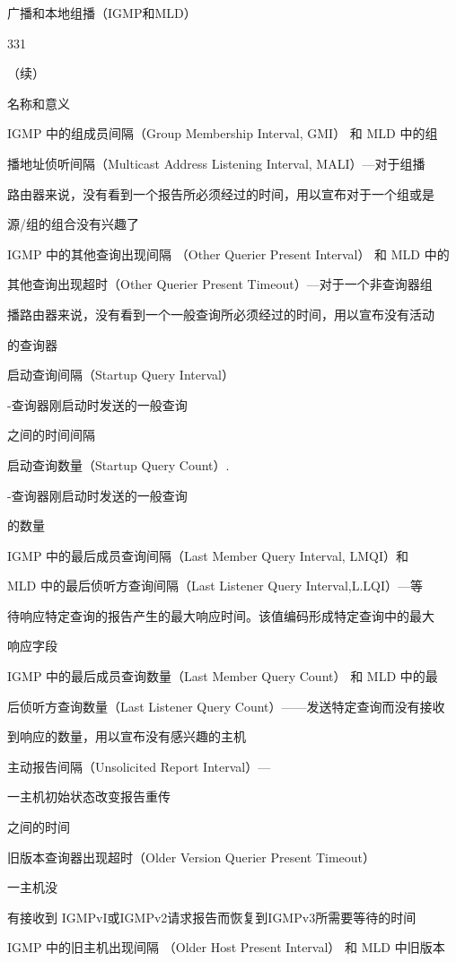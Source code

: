 广播和本地组播（IGMP和MLD）

331

（续）

名称和意义

IGMP 中的组成员间隔（Group Membership Interval, GMI） 和 MLD 中的组

播地址侦听间隔（Multicast Address Listening Interval, MALI）—对于组播

路由器来说，没有看到一个报告所必须经过的时间，用以宣布对于一个组或是

源/组的组合没有兴趣了

IGMP 中的其他查询出现间隔 （Other Querier Present Interval） 和 MLD 中的

其他查询出现超时（Other Querier Present Timeout）—对于一个非查询器组

播路由器来说，没有看到一个一般查询所必须经过的时间，用以宣布没有活动

的查询器

启动查询间隔（Startup Query Interval）

-查询器刚启动时发送的一般查询

之间的时间间隔

启动查询数量（Startup Query Count）.

-查询器刚启动时发送的一般查询

的数量

IGMP 中的最后成员查询间隔（Last Member Query Interval, LMQI）和

MLD 中的最后侦听方查询间隔（Last Listener Query Interval,L.LQI）—等

待响应特定查询的报告产生的最大响应时间。该值编码形成特定查询中的最大

响应字段

IGMP 中的最后成员查询数量（Last Member Query Count） 和 MLD 中的最

后侦听方查询数量（Last Listener Query Count）——发送特定查询而没有接收

到响应的数量，用以宣布没有感兴趣的主机

主动报告间隔（Unsolicited Report Interval）—

一主机初始状态改变报告重传

之间的时间

旧版本查询器出现超时（Older Version Querier Present Timeout）

一主机没

有接收到 IGMPvI或IGMPv2请求报告而恢复到IGMPv3所需要等待的时间

IGMP 中的旧主机出现间隔 （Older Host Present Interval） 和 MLD 中旧版本

